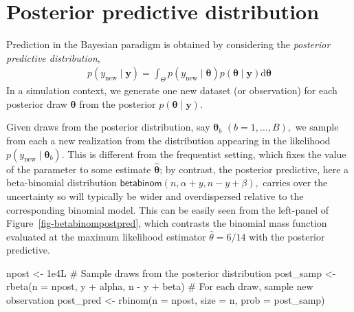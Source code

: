 \documentclass[
  11pt,
  letterpaper,
]{scrbook}
\newenvironment{Shaded}{\begin{snugshade}}{\end{snugshade}}
\newcommand{\AttributeTok}[1]{\textcolor[rgb]{0.40,0.45,0.13}{#1}}
\newcommand{\CommentTok}[1]{\textcolor[rgb]{0.37,0.37,0.37}{#1}}
\newcommand{\FloatTok}[1]{\textcolor[rgb]{0.68,0.00,0.00}{#1}}
\newcommand{\FunctionTok}[1]{\textcolor[rgb]{0.28,0.35,0.67}{#1}}
\newcommand{\NormalTok}[1]{\textcolor[rgb]{0.00,0.23,0.31}{#1}}
\newcommand{\OtherTok}[1]{\textcolor[rgb]{0.00,0.23,0.31}{#1}}
\newcommand{\SpecialCharTok}[1]{\textcolor[rgb]{0.37,0.37,0.37}{#1}}
\theoremstyle{definition}
\theoremstyle{plain}
\theoremstyle{plain}
\theoremstyle{plain}
\theoremstyle{definition}
\theoremstyle{definition}
\theoremstyle{plain}
\theoremstyle{plain}
\theoremstyle{remark}
\begin{document}
\section{Posterior predictive
distribution}\label{posterior-predictive-distribution}

Prediction in the Bayesian paradigm is obtained by considering the
\emph{posterior predictive distribution}, \begin{align*}
p(y_{\text{new}} \mid \boldsymbol{y}) =
\int_{\Theta} p(y_{\text{new}}  \mid \boldsymbol{\theta}) p(\boldsymbol{\theta} \mid  \boldsymbol{y}) \mathrm{d} \boldsymbol{\theta}
\end{align*} In a simulation context, we generate one new dataset (or
observation) for each posterior draw \(\boldsymbol{\theta}\) from the
posterior \(p(\boldsymbol{\theta} \mid  \boldsymbol{y}).\)

Given draws from the posterior distribution, say
\(\boldsymbol{\theta}_b\) \((b=1, \ldots, B),\) we sample from each a
new realization from the distribution appearing in the likelihood
\(p(y_{\text{new}}  \mid \boldsymbol{\theta}_b).\) This is different
from the frequentist setting, which fixes the value of the parameter to
some estimate \(\widehat{\boldsymbol{\theta}}\); by contrast, the
posterior predictive, here a beta-binomial distribution
\(\mathsf{beta binom}(n, \alpha + y, n - y + \beta),\) carries over the
uncertainty so will typically be wider and overdispersed relative to the
corresponding binomial model. This can be easily seen from the
left-panel of Figure~\ref{fig-betabinompostpred}, which contrasts the
binomial mass function evaluated at the maximum likelihood estimator
\(\widehat{\theta}=6/14\) with the posterior predictive.

\begin{Shaded}
\begin{Highlighting}[]
\NormalTok{npost }\OtherTok{\textless{}{-}} \FloatTok{1e4}\NormalTok{L}
\CommentTok{\# Sample draws from the posterior distribution}
\NormalTok{post\_samp }\OtherTok{\textless{}{-}} \FunctionTok{rbeta}\NormalTok{(}\AttributeTok{n =}\NormalTok{ npost, y }\SpecialCharTok{+}\NormalTok{ alpha, n }\SpecialCharTok{{-}}\NormalTok{ y }\SpecialCharTok{+}\NormalTok{ beta)}
\CommentTok{\# For each draw, sample new observation}
\NormalTok{post\_pred }\OtherTok{\textless{}{-}} \FunctionTok{rbinom}\NormalTok{(}\AttributeTok{n =}\NormalTok{ npost, }\AttributeTok{size =}\NormalTok{ n, }\AttributeTok{prob =}\NormalTok{ post\_samp)}
\end{Highlighting}
\end{Shaded}
\end{document}
